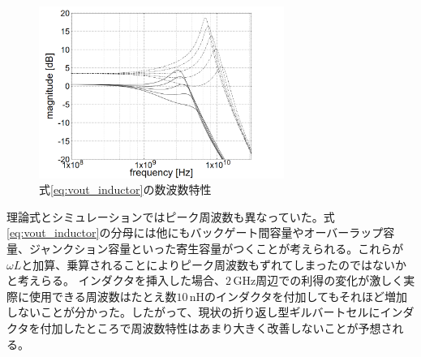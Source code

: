 \documentclass[twocolumn]{jsarticle}
\begin{document}
    \begin{figure}[H]
        \begin{center}
            \includegraphics*[width = 80mm]{figures/inductor_monochrome.PNG}
            \caption{式\eqref{eq:vout_inductor}の数波数特性}
            \label{fig:inductor}
        \end{center}
    \end{figure}
    理論式とシミュレーションではピーク周波数も異なっていた。式\eqref{eq:vout_inductor}の分母には他にもバックゲート間容量やオーバーラップ容量、ジャンクション容量といった寄生容量がつくことが考えられる。これらが$\omega L$と加算、乗算されることによりピーク周波数もずれてしまったのではないかと考えらる。
    インダクタを挿入した場合、$2\,\mathrm{GHz}$周辺での利得の変化が激しく実際に使用できる周波数はたとえ数$10\,\mathrm{nH}$のインダクタを付加してもそれほど増加しないことが分かった。したがって、現状の折り返し型ギルバートセルにインダクタを付加したところで周波数特性はあまり大きく改善しないことが予想される。
\end{document}
